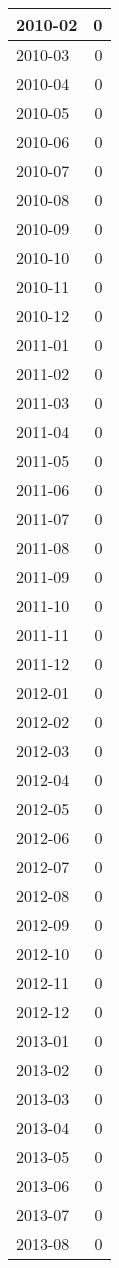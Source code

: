 \documentclass[
]{article}
\begin{document}
\begin{table}[H]
\begin{tabular}{l|r}
\hline
2010-02 & 0\\
\hline
2010-03 & 0\\
\hline
2010-04 & 0\\
\hline
2010-05 & 0\\
\hline
2010-06 & 0\\
\hline
2010-07 & 0\\
\hline
2010-08 & 0\\
\hline
2010-09 & 0\\
\hline
2010-10 & 0\\
\hline
2010-11 & 0\\
\hline
2010-12 & 0\\
\hline
2011-01 & 0\\
\hline
2011-02 & 0\\
\hline
2011-03 & 0\\
\hline
2011-04 & 0\\
\hline
2011-05 & 0\\
\hline
2011-06 & 0\\
\hline
2011-07 & 0\\
\hline
2011-08 & 0\\
\hline
2011-09 & 0\\
\hline
2011-10 & 0\\
\hline
2011-11 & 0\\
\hline
2011-12 & 0\\
\hline
2012-01 & 0\\
\hline
2012-02 & 0\\
\hline
2012-03 & 0\\
\hline
2012-04 & 0\\
\hline
2012-05 & 0\\
\hline
2012-06 & 0\\
\hline
2012-07 & 0\\
\hline
2012-08 & 0\\
\hline
2012-09 & 0\\
\hline
2012-10 & 0\\
\hline
2012-11 & 0\\
\hline
2012-12 & 0\\
\hline
2013-01 & 0\\
\hline
2013-02 & 0\\
\hline
2013-03 & 0\\
\hline
2013-04 & 0\\
\hline
2013-05 & 0\\
\hline
2013-06 & 0\\
\hline
2013-07 & 0\\
\hline
2013-08 & 0\\

\end{tabular}
\end{table}
\end{document}
